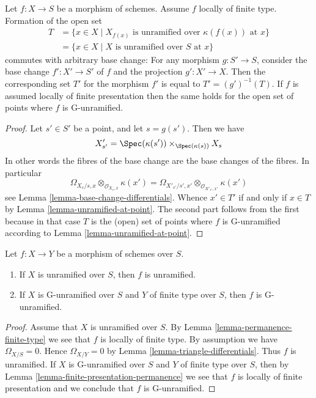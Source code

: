 \begin{lemma}
\label{lemma-set-points-where-fibres-unramified}
Let $f : X \to S$ be a morphism of schemes.
Assume $f$ locally of finite type. Formation of the open set
\begin{align*}
T
& =
\{x \in X \mid X_{f(x)}\text{ is unramified over }\kappa(f(x))\text{ at }x\} \\
& =
\{x \in X \mid X\text{ is unramified over }S\text{ at }x\}
\end{align*}
commutes with arbitrary base change:
For any morphism $g : S' \to S$, consider
the base change $f' : X' \to S'$ of $f$ and the
projection $g' : X' \to X$. Then the corresponding
set $T'$ for the morphism $f'$ is equal to $T' = (g')^{-1}(T)$.
If $f$ is assumed locally of finite presentation then the same holds
for the open set of points where $f$ is G-unramified.
\end{lemma}

\begin{proof}
Let $s' \in S'$ be a point, and let $s = g(s')$. Then we have
$$
X'_{s'} =
\Spec(\kappa(s')) \times_{\Spec(\kappa(s))} X_s
$$
In other words the fibres of the base change are the base changes
of the fibres. In particular
$$
\Omega_{X_s/s, x} \otimes_{\mathcal{O}_{X_s, x}} \kappa(x')
=
\Omega_{X'_{s'}/s', x'} \otimes_{\mathcal{O}_{X'_{s'}, x'}} \kappa(x')
$$
see
Lemma \ref{lemma-base-change-differentials}.
Whence $x' \in T'$ if and only if $x \in T$ by
Lemma \ref{lemma-unramified-at-point}.
The second part follows from the first because in that case
$T$ is the (open) set of points where $f$ is G-unramified according to
Lemma \ref{lemma-unramified-at-point}.
\end{proof}

\begin{lemma}
\label{lemma-unramified-permanence}
Let $f : X \to Y$ be a morphism of schemes over $S$.
\begin{enumerate}
\item If $X$ is unramified over $S$, then $f$ is unramified.
\item If $X$ is G-unramified over $S$ and $Y$ of finite type over $S$, then
$f$ is G-unramified.
\end{enumerate}
\end{lemma}

\begin{proof}
Assume that $X$ is unramified over $S$.
By Lemma \ref{lemma-permanence-finite-type} we see that $f$
is locally of finite type.
By assumption we have $\Omega_{X/S} = 0$. Hence
$\Omega_{X/Y} = 0$ by Lemma \ref{lemma-triangle-differentials}. Thus
$f$ is unramified. If $X$ is G-unramified over $S$ and $Y$ of finite type
over $S$, then by
Lemma \ref{lemma-finite-presentation-permanence}
we see that $f$ is locally of finite presentation and we conclude
that $f$ is G-unramified.
\end{proof}

